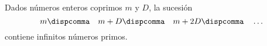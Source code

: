 
\begin{teoDirichlet}[Dirichlet]\label{teo:dirichlet}
	Dados n\'umeros enteros coprimos $m$ y $D$, la sucesi\'on
	\begin{displaymath}
		m\dispcomma\quad
		m+D\dispcomma\quad
		m+2 D\dispcomma\quad\dots
	\end{displaymath}
	contiene infinitos n\'umeros primos.
\end{teoDirichlet}

